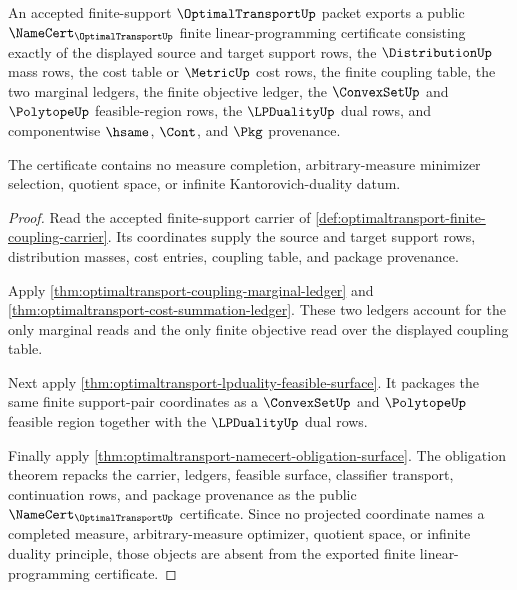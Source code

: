 \begin{theorem}
\label{thm:optimaltransport-public-finite-lp-certificate}
An accepted finite-support $\OptimalTransportUp$ packet exports a public
$\NameCert_{\OptimalTransportUp}$ finite linear-programming certificate
consisting exactly of the displayed source and target support rows, the
$\DistributionUp$ mass rows, the cost table or $\MetricUp$ cost rows, the
finite coupling table, the two marginal ledgers, the finite objective ledger,
the $\ConvexSetUp$ and $\PolytopeUp$ feasible-region rows, the
$\LPDualityUp$ dual rows, and componentwise $\hsame$, $\Cont$, and $\Pkg$
provenance.

The certificate contains no measure completion, arbitrary-measure minimizer
selection, quotient space, or infinite Kantorovich-duality datum.
\end{theorem}
\begin{proof}
Read the accepted finite-support carrier of
\autoref{def:optimaltransport-finite-coupling-carrier}. Its coordinates supply
the source and target support rows, distribution masses, cost entries, coupling
table, and package provenance.

Apply \autoref{thm:optimaltransport-coupling-marginal-ledger} and
\autoref{thm:optimaltransport-cost-summation-ledger}. These two ledgers account
for the only marginal reads and the only finite objective read over the
displayed coupling table.

Next apply \autoref{thm:optimaltransport-lpduality-feasible-surface}. It
packages the same finite support-pair coordinates as a $\ConvexSetUp$ and
$\PolytopeUp$ feasible region together with the $\LPDualityUp$ dual rows.

Finally apply \autoref{thm:optimaltransport-namecert-obligation-surface}. The
obligation theorem repacks the carrier, ledgers, feasible surface, classifier
transport, continuation rows, and package provenance as the public
$\NameCert_{\OptimalTransportUp}$ certificate. Since no projected coordinate
names a completed measure, arbitrary-measure optimizer, quotient space, or
infinite duality principle, those objects are absent from the exported finite
linear-programming certificate.
\end{proof}


